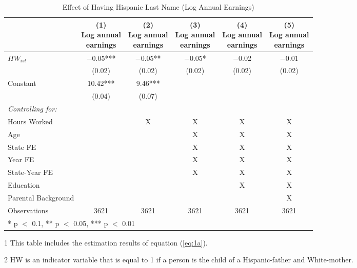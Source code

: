 \begin{table}[H]
\centering\centering
\caption{Effect of Having Hispanic Last Name (Log Annual Earnings) \label{tab:lastnamereg}}
\centering
\begin{threeparttable}
\begin{tabular}[t]{lccccc}
\toprule
  & \specialcell{(1) \\ Log annual \\ earnings} & \specialcell{(2) \\ Log annual \\ earnings} & \specialcell{(3) \\ Log annual \\ earnings} & \specialcell{(4) \\  Log annual \\ earnings} & \specialcell{(5) \\  Log annual \\ earnings}\\
\midrule
$HW_{ist}$ & \num{-0.05}*** & \num{-0.05}** & \num{-0.05}* & \num{-0.02} & \num{-0.01}\\
 & (\num{0.02}) & (\num{0.02}) & (\num{0.02}) & (\num{0.02}) & (\num{0.02})\\
Constant & \num{10.42}*** & \num{9.46}*** &  &  & \\
 & (\num{0.04}) & (\num{0.07}) &  &  & \\
\midrule
\textit{Controlling for:} &  &  &  &  & \\
Hours Worked &  & X & X & X & X\\
Age &  &  & X & X & X\\
State FE &  &  & X & X & X\\
Year FE &  &  & X & X & X\\
State-Year FE &  &  & X & X & X\\
Education &  &  &  & X & X\\
Parental Background &  &  &  &  & X\\
Observations & \num{3621} & \num{3621} & \num{3621} & \num{3621} & \num{3621}\\
\bottomrule
\multicolumn{6}{l}{\rule{0pt}{1em}* p $<$ 0.1, ** p $<$ 0.05, *** p $<$ 0.01}\\
\end{tabular}
\begin{tablenotes}
\item[1] {\footnotesize{This table includes the estimation results of equation (\ref{eq:1a}).}}
\item[2] {\footnotesize{HW is an indicator variable that is equal to 1 if a person is the child of a Hispanic-father and White-mother.}}

\end{tablenotes}
\end{threeparttable}
\end{table}
